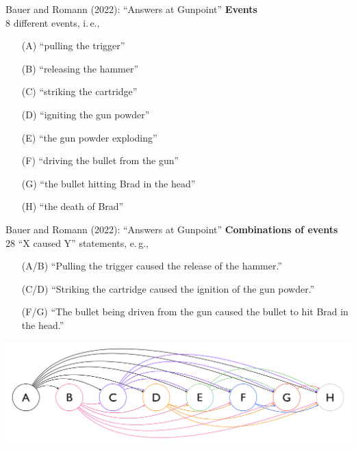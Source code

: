 \documentclass[xcolor=table,9pt,aspectratio=169]{beamer}
\begin{document}
\begin{frame}{\vspace*{10mm}Bauer and Romann (2022): ``Answers at Gunpoint''}
\vspace*{-5mm}
\textbf{Events}\\
8 different events, i.\,e.,
\begin{itemize}
   \item[(A)] ``pulling the trigger''
   \item[(B)] ``releasing the hammer''
   \item[(C)] ``striking the cartridge''
   \item[(D)] ``igniting the gun powder''
   \item[(E)] ``the gun powder exploding''
   \item[(F)] ``driving the bullet from the gun''
   \item[(G)] ``the bullet hitting Brad in the head''
   \item[(H)] ``the death of Brad''
\end{itemize}
\vfill
\end{frame}


\begin{frame}{\vspace*{10mm}Bauer and Romann (2022): ``Answers at Gunpoint''}
\vspace*{-5mm}
\textbf{Combinations of events}\\
28 ``X caused Y'' statements, e.\,g.,
\begin{itemize}
   \item[(A/B)] ``Pulling the trigger caused the release of the hammer.''
   \item[(C/D)] ``Striking the cartridge caused the ignition of the gun powder.''
   \item[(F/G)] ``The bullet being driven from the gun caused the bullet to hit Brad in the head.''
\end{itemize}
\hfill
\begin{center}
   \includegraphics[width=.8\linewidth]{figures/combinations.pdf}
\end{center}
\end{frame}
\end{document}
